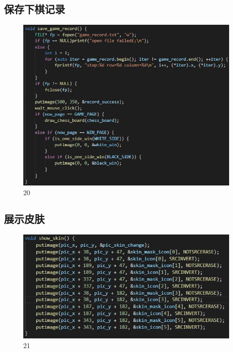 \documentclass[UTF8]{ctexart}
\begin{document}
\subsection{保存下棋记录}
\begin{figure}[H]
    \centering
    \includegraphics[scale=0.9]{19.jpg}
\caption{20}
\end{figure}
\subsection{展示皮肤}
\begin{figure}[H]
    \centering
    \includegraphics[scale=0.8]{20.jpg}
\caption{21}
\end{figure}
\end{document}
